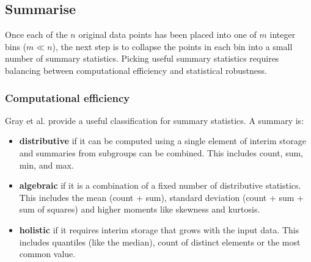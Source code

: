 \documentclass[journal]{vgtc}                %
\begin{document}


\subsection{Summarise}
\label{sub:summarise}

Once each of the $n$ original data points has been placed into one of $m$ integer bins ($m \ll n$), the next step is to collapse the points in each bin into a small number of summary statistics. Picking useful summary statistics requires balancing between computational efficiency and statistical robustness. 

\subsubsection{Computational efficiency}

Gray et al. \citep{gray:1997} provide a useful classification for summary statistics. A summary is:

\begin{itemize}
  \item {\bf distributive} if it can be computed using a single element of interim storage and summaries from subgroups can be combined. This includes count, sum, min, and max.
  
  \item {\bf algebraic} if it is a combination of a fixed number of distributive statistics. This includes the mean (count + sum), standard deviation (count + sum + sum of squares) and higher moments like skewness and kurtosis.
  
  \item {\bf holistic} if it requires interim storage that grows with the input data. This includes quantiles (like the median), count of distinct elements or the most common value. 

\end{itemize}
\end{document}
